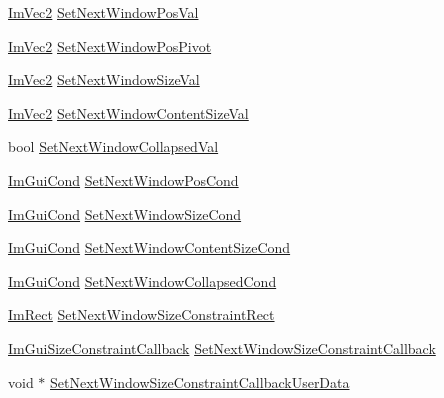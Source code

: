 \begin{DoxyCompactItemize}
\item 
\mbox{\hyperlink{struct_im_vec2}{Im\+Vec2}} \mbox{\hyperlink{struct_im_gui_context_a8cb5445e4f740af210aa1794707dffbc}{Set\+Next\+Window\+Pos\+Val}}
\item 
\mbox{\hyperlink{struct_im_vec2}{Im\+Vec2}} \mbox{\hyperlink{struct_im_gui_context_a0da8611453fefe211a63abce142f9d74}{Set\+Next\+Window\+Pos\+Pivot}}
\item 
\mbox{\hyperlink{struct_im_vec2}{Im\+Vec2}} \mbox{\hyperlink{struct_im_gui_context_a80a09eeab06dd8abaa79cc5d26998af4}{Set\+Next\+Window\+Size\+Val}}
\item 
\mbox{\hyperlink{struct_im_vec2}{Im\+Vec2}} \mbox{\hyperlink{struct_im_gui_context_aa861c8e8d3b52e2fe8b581a4a132c39b}{Set\+Next\+Window\+Content\+Size\+Val}}
\item 
bool \mbox{\hyperlink{struct_im_gui_context_a81c9c14d3ab622586aa5ca0866634b21}{Set\+Next\+Window\+Collapsed\+Val}}
\item 
\mbox{\hyperlink{imgui_8h_aef890d6ac872e12c5804d0b3e4f7f103}{Im\+Gui\+Cond}} \mbox{\hyperlink{struct_im_gui_context_afdf440b5e79ba7868e87e2c5136e1296}{Set\+Next\+Window\+Pos\+Cond}}
\item 
\mbox{\hyperlink{imgui_8h_aef890d6ac872e12c5804d0b3e4f7f103}{Im\+Gui\+Cond}} \mbox{\hyperlink{struct_im_gui_context_ad0a5c6930741d040141ab7b097064c20}{Set\+Next\+Window\+Size\+Cond}}
\item 
\mbox{\hyperlink{imgui_8h_aef890d6ac872e12c5804d0b3e4f7f103}{Im\+Gui\+Cond}} \mbox{\hyperlink{struct_im_gui_context_af19b3352e14a7ac48f8c9a58e63eda9b}{Set\+Next\+Window\+Content\+Size\+Cond}}
\item 
\mbox{\hyperlink{imgui_8h_aef890d6ac872e12c5804d0b3e4f7f103}{Im\+Gui\+Cond}} \mbox{\hyperlink{struct_im_gui_context_a90e757b4703c106ecd41b05670f5799a}{Set\+Next\+Window\+Collapsed\+Cond}}
\item 
\mbox{\hyperlink{struct_im_rect}{Im\+Rect}} \mbox{\hyperlink{struct_im_gui_context_ab0e529d62651845ef9ae265447e1d0c8}{Set\+Next\+Window\+Size\+Constraint\+Rect}}
\item 
\mbox{\hyperlink{imgui_8h_abc6351d68ee31882cbb95d2b3d835cae}{Im\+Gui\+Size\+Constraint\+Callback}} \mbox{\hyperlink{struct_im_gui_context_a304a1bfd5dbcebee45ba8cdfa5d231cb}{Set\+Next\+Window\+Size\+Constraint\+Callback}}
\item 
void $\ast$ \mbox{\hyperlink{struct_im_gui_context_a5da8374c369cff287b16ac7d8e3a7901}{Set\+Next\+Window\+Size\+Constraint\+Callback\+User\+Data}}
\item 

\end{DoxyCompactItemize}
